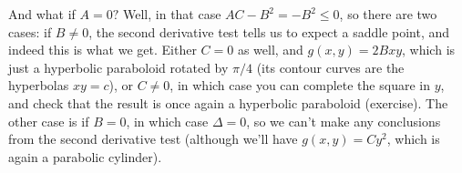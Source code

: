 \documentclass[12pt,letterpaper]{article}
\begin{document}
And what if $A=0?$ Well, in that case $AC-B^2=-B^2\leq 0$, so there are two cases: if $B\neq 0$, the second derivative test tells us to expect a saddle point, and indeed this is what we get. Either $C=0$ as well, and $g(x,y) = 2Bxy$, which is just a hyperbolic paraboloid rotated by $\pi/4$ (its contour curves are the hyperbolas $xy=c$), or $C\neq 0$, in which case you can complete the square in $y$, and check that the result is once again a hyperbolic paraboloid (exercise). The other case is if $B=0$, in which case $\Delta =0$, so we can't make any conclusions from the second derivative test (although we'll have $g(x,y)=Cy^2$, which is again a parabolic cylinder).
\end{document}
